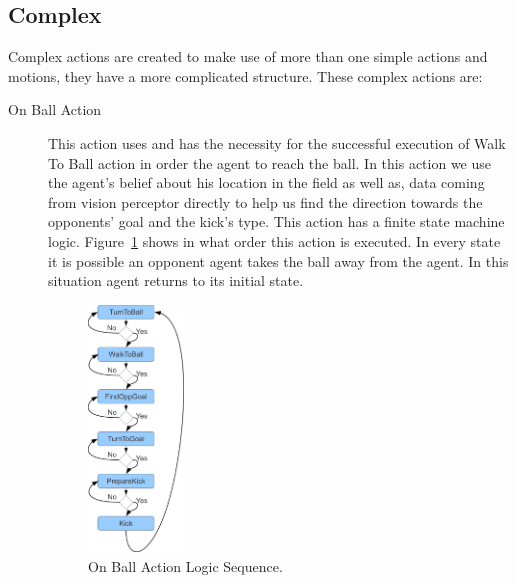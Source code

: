 \subsection{Complex}
Complex actions are created to make use of more than one simple actions and motions, they have a more complicated structure. These complex actions are:
\begin{description}
 \item[On Ball Action] This action uses and has the necessity for the successful execution of Walk To Ball action in order the agent to reach the ball. In this action we use the agent's belief about his location in the field as well as, data coming from vision perceptor directly to help us find the direction towards the opponents' goal and the kick's type. This action has a finite state machine logic. Figure~\ref{fig:GoKickBallToGoal} shows in what order this action is executed. In every state it is possible an opponent agent takes the ball away from the agent. In this situation agent returns to its initial state.


 \begin{figure}[t!]
\centering
  \includegraphics[width=0.25\textwidth]{Chapter3/figures/KickFSM.pdf}
  \caption{On Ball Action Logic Sequence.}
  \label{fig:GoKickBallToGoal}
\end{figure}




\end{description}
